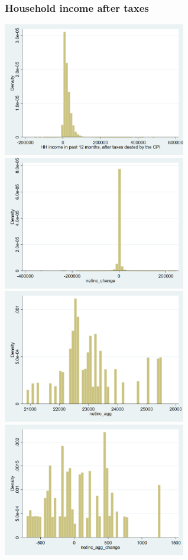 \documentclass[12pt,a4paper]{article}
\begin{document}
\subsubsection*{Household income after taxes}
\begin{center}
\includegraphics[width=8cm]{graphs/netinc.png}
\includegraphics[width=8cm]{graphs/netinc_change.png}\\
\includegraphics[width=8cm]{graphs/netinc_agg.png}
\includegraphics[width=8cm]{graphs/netinc_agg_change.png}\\

\end{center}
\end{document}
